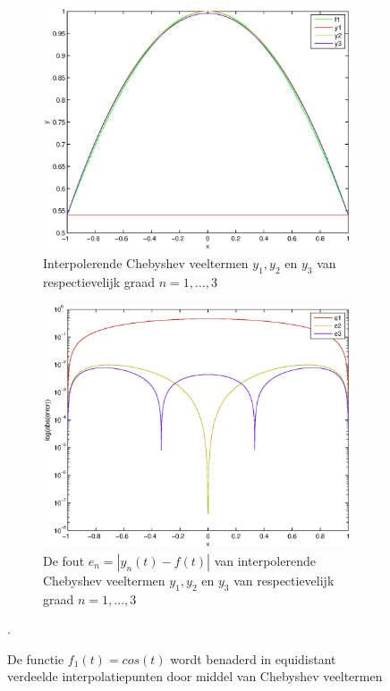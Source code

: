 \documentclass[a4paper]{article}
\begin{document}
\begin{figure}
    \centering
    \begin{subfigure}[b]{\textwidth}
        \centering
        \includegraphics[width=\textwidth]{Jona/linspace_cos_interpolation.eps}
        \caption{Interpolerende Chebyshev veeltermen $y_{1},y_{2}$ en $y_{3}$ van respectievelijk graad $n=1,\dots,3$}
        \label{fig:lin_cos_interpol}
        \vspace*{1cm}
    \end{subfigure}
    \begin{subfigure}[b]{\textwidth}
        \centering
        \includegraphics[width=\textwidth]{Jona/linspace_cos_error.eps}
        \caption{De fout $e_{n} = |y_{n}(t)-f(t)|$ van interpolerende Chebyshev veeltermen $y_{1},y_{2}$ en $y_{3}$ van respectievelijk graad $n=1,\dots,3$}
        \label{fig:lin_cos_error}
        \vspace*{1cm}
    \end{subfigure}
    \hfill
    \caption{De functie $f_{1}(t) = cos(t)$ wordt benaderd in equidistant verdeelde interpolatiepunten door middel van Chebyshev veeltermen}\label{fig:lin_cos}.
\end{figure}
\end{document}
